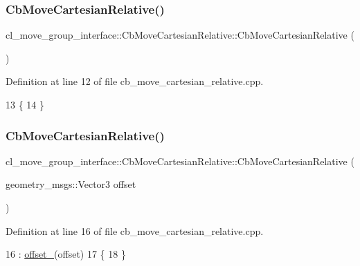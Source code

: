 \subsubsection{\texorpdfstring{Cb\+Move\+Cartesian\+Relative()}{CbMoveCartesianRelative()}\hspace{0.1cm}{\footnotesize\ttfamily [1/2]}}
{\footnotesize\ttfamily cl\+\_\+move\+\_\+group\+\_\+interface\+::\+Cb\+Move\+Cartesian\+Relative\+::\+Cb\+Move\+Cartesian\+Relative (\begin{DoxyParamCaption}{ }\end{DoxyParamCaption})}



Definition at line 12 of file cb\+\_\+move\+\_\+cartesian\+\_\+relative.\+cpp.


\begin{DoxyCode}
13 \{
14 \}
\end{DoxyCode}
\mbox{\label{classcl__move__group__interface_1_1CbMoveCartesianRelative_a725ebdd1fdbc3c7a356e9c94cbc14259}} 
\subsubsection{\texorpdfstring{Cb\+Move\+Cartesian\+Relative()}{CbMoveCartesianRelative()}\hspace{0.1cm}{\footnotesize\ttfamily [2/2]}}
{\footnotesize\ttfamily cl\+\_\+move\+\_\+group\+\_\+interface\+::\+Cb\+Move\+Cartesian\+Relative\+::\+Cb\+Move\+Cartesian\+Relative (\begin{DoxyParamCaption}\item[{geometry\+\_\+msgs\+::\+Vector3}]{offset }\end{DoxyParamCaption})}



Definition at line 16 of file cb\+\_\+move\+\_\+cartesian\+\_\+relative.\+cpp.


\begin{DoxyCode}
16                                                                             : 
      \hyperlink{classcl__move__group__interface_1_1CbMoveCartesianRelative_aac5b6c2f42406da43f94cd5334aca925}{offset\_}(offset)
17 \{
18 \}
\end{DoxyCode}


